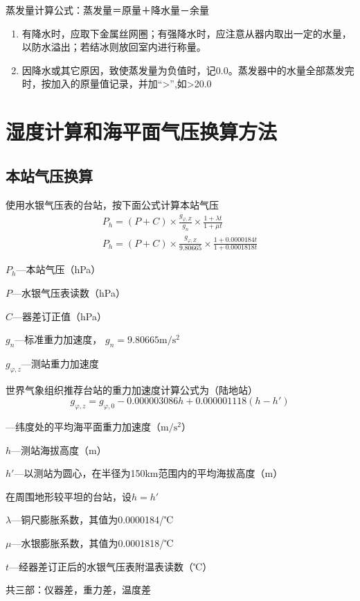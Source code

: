 ﻿\documentclass[UTF8,11pt]{ctexbook}%
\begin{document}
蒸发量计算公式：蒸发量＝原量＋降水量－余量

\begin{enumerate}
	\item 有降水时，应取下金属丝网圈；有强降水时，应注意从器内取出一定的水量，以防水溢出；若结冰则放回室内进行称量。
	\item 因降水或其它原因，致使蒸发量为负值时，记0.0。蒸发器中的水量全部蒸发完时，按加入的原量值记录，并加“>”,如>20.0
\end{enumerate}

\chapter{湿度计算和海平面气压换算方法}

\section{本站气压换算}

使用水银气压表的台站，按下面公式计算本站气压
\begin{gather*}
	P_h=(P+C)\times\frac{g_{\varphi, Z}}{g_n}\times\frac{1+\lambda t}{1+\mu t}\\
	P_h=(P+C)\times\frac{g_{\varphi, Z}}{9.80665}\times\frac{1+0.0000184t}{1+0.0001818t}
\end{gather*}

\(P_h\)—本站气压（hPa）

\(P\)—水银气压表读数（hPa）

\(C\)—器差订正值（hPa）

\(g_n\)—标准重力加速度， \(g_n=9.80665\mathrm{m/s^2}\)

\(g_{\varphi, z}\)—测站重力加速度

世界气象组织推荐台站的重力加速度计算公式为（陆地站）
\[
g_{\varphi, z}=g_{\varphi, 0}-0.000003086h+0.000001118(h-h')
\]

—纬度处的平均海平面重力加速度（\(\mathrm{m/s^2}\)）

\(h\)—测站海拔高度（m）

\(h'\)—以测站为圆心，在半径为150km范围内的平均海拔高度（m）

在周围地形较平坦的台站，设\(h=h'\)

\(\lambda\)—铜尺膨胀系数，其值为0.0000184/℃

\(\mu\)—水银膨胀系数，其值为0.0001818/℃

\(t\)—经器差订正后的水银气压表附温表读数（℃）

共三部：仪器差，重力差，温度差
\end{document}

